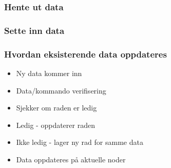 
\subsubsection{Hente ut data}

\subsubsection{Sette inn data}

\subsubsection{Hvordan eksisterende data oppdateres}
\begin{itemize}
  \item Ny data kommer inn
  \item Data/kommando verifisering
  \item Sjekker om raden er ledig
  \item Ledig - oppdaterer raden
  \item Ikke ledig - lager ny rad for samme data
  \item Data oppdateres på aktuelle noder
\end{itemize}